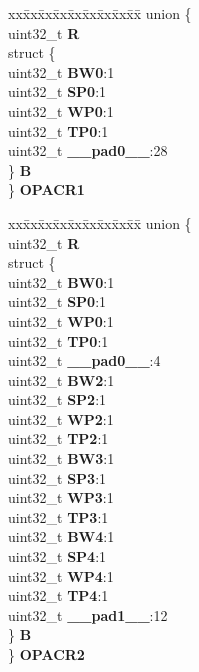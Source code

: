 \begin{DoxyCompactItemize}
\begin{tabbing}
\end{tabbing}\item 
\mbox{\label{structPBRIDGE__A__tag_af62b346bece0dc2f6130a902abec635b}} 
\begin{tabbing}
xx\=xx\=xx\=xx\=xx\=xx\=xx\=xx\=xx\=\kill
union \{\\
\>uint32\_t {\bfseries R}\\
\>struct \{\\
\>\>uint32\_t {\bfseries BW0}:1\\
\>\>uint32\_t {\bfseries SP0}:1\\
\>\>uint32\_t {\bfseries WP0}:1\\
\>\>uint32\_t {\bfseries TP0}:1\\
\>\>uint32\_t {\bfseries \_\_pad0\_\_}:28\\
\>\} {\bfseries B}\\
\} {\bfseries OPACR1}\\

\end{tabbing}\item 
\mbox{\label{structPBRIDGE__A__tag_a59a191939415608b3f93a59c80d7ca5e}} 
\begin{tabbing}
xx\=xx\=xx\=xx\=xx\=xx\=xx\=xx\=xx\=\kill
union \{\\
\>uint32\_t {\bfseries R}\\
\>struct \{\\
\>\>uint32\_t {\bfseries BW0}:1\\
\>\>uint32\_t {\bfseries SP0}:1\\
\>\>uint32\_t {\bfseries WP0}:1\\
\>\>uint32\_t {\bfseries TP0}:1\\
\>\>uint32\_t {\bfseries \_\_pad0\_\_}:4\\
\>\>uint32\_t {\bfseries BW2}:1\\
\>\>uint32\_t {\bfseries SP2}:1\\
\>\>uint32\_t {\bfseries WP2}:1\\
\>\>uint32\_t {\bfseries TP2}:1\\
\>\>uint32\_t {\bfseries BW3}:1\\
\>\>uint32\_t {\bfseries SP3}:1\\
\>\>uint32\_t {\bfseries WP3}:1\\
\>\>uint32\_t {\bfseries TP3}:1\\
\>\>uint32\_t {\bfseries BW4}:1\\
\>\>uint32\_t {\bfseries SP4}:1\\
\>\>uint32\_t {\bfseries WP4}:1\\
\>\>uint32\_t {\bfseries TP4}:1\\
\>\>uint32\_t {\bfseries \_\_pad1\_\_}:12\\
\>\} {\bfseries B}\\
\} {\bfseries OPACR2}\\


\end{tabbing}
\end{DoxyCompactItemize}

